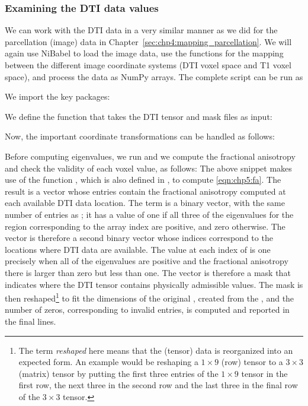 \subsubsection*{Examining the DTI data values}
We can work with the DTI data in a very similar manner as we did
for the parcellation (image) data in
Chapter~\ref{sec:chp4:mapping_parcellation}. We will again use NiBabel
to load the image data, use the  functions for the mapping
between the different image coordinate systems (DTI voxel space and T1
voxel space), and process the data as NumPy arrays. The complete
script can be run as

We import the key packages:

\noindent We define the function  that takes the DTI
tensor and mask files as input: 

\noindent Now, the important coordinate transformations can be handled as follows:

\noindent Before computing eigenvalues, we run
and we compute the fractional anisotropy and check the validity of each voxel value, as follows:
The above snippet makes use of the function , which
is also defined in , to compute
\eqref{eqn:chp5:fa}. The result is a vector  whose entries
contain the fractional anisotropy computed at each available DTI data
location. The term  is a binary vector, with the same
number of entries as ; it has a value of one if all three of
the eigenvalues for the region corresponding to the array index are
positive, and zero otherwise.  The vector  is therefore a
second binary vector whose indices correspond to the locations where
DTI data are available. The value at each index of  is one
precisely when all of the eigenvalues are positive and the fractional
anisotropy there is larger than zero but less than one. The
 vector is therefore a mask that indicates where the DTI
tensor contains physically admissible values.  The  mask is
then reshaped\footnote{The term \textit{reshaped} here means that the
  (tensor) data is reorganized into an expected form. An example would
  be reshaping a $1\times 9$ (row) tensor to a $3\times 3$ (matrix)
  tensor by putting the first three entries of the $1\times 9$ tensor
  in the first row, the next three in the second row and the last
  three in the final row of the $3\times 3$ tensor.}  to fit the
dimensions of the original , created from the
, and the number of zeros, corresponding to invalid
entries, is computed and reported in the final lines.

